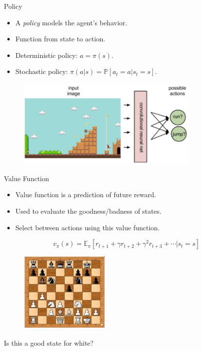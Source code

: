 \documentclass{beamer}
\begin{document}
\begin{frame}{Policy}
    \begin{itemize}
        \item A \emph{policy} models the agent's behavior.
        \item Function from state to action.
        \item Deterministic policy: $a = \pi(s)$.
        \item Stochastic policy: $\pi(a|s) = \mathbb{P}[a_t=a|s_t=s]$.
    \end{itemize}
    
    \begin{figure}
        \centering
        \includegraphics[width=0.8\textwidth]{images/policy_func}
    \end{figure}
\end{frame}

\begin{frame}{Value Function}
    \begin{itemize}
        \item Value function is a prediction of future reward.
        \item Used to evaluate the goodness/badness of states.
        \item Select between actions using this value function.
    \end{itemize}    
    
    \begin{equation*}
        v_{\pi}(s) = \mathbb{E}_{\pi}[r_{t+1} + \gamma r_{t+2} + \gamma^2 r_{t+3} + \cdots | s_t=s]
    \end{equation*}
    
    \begin{figure}
        \centering
        \includegraphics[width=0.4\textwidth]{images/chess_value}
    \end{figure}
    \centering Is this a good state for white?
\end{frame}
\end{document}
